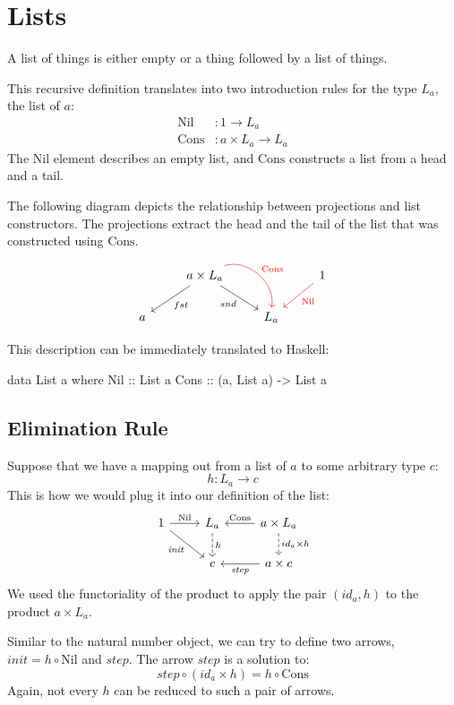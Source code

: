 \documentclass[DaoFP]{subfiles}
\begin{document}
\section{Lists}

A list of things is either empty or a thing followed by a list of things. 

This recursive definition translates into two introduction rules for the type $L_a$, the list of $a$: 
\begin{align*}
 \text{Nil} &\colon 1 \to L_a \\
 \text{Cons} &\colon a \times L_a \to L_a 
\end{align*}
The $\text{Nil}$ element describes an empty list, and $\text{Cons}$ constructs a list from a head and a tail. 

The following diagram depicts the relationship between projections and list constructors. The projections extract the head and the tail of the list that was constructed using $\text{Cons}$.
\[
 \begin{tikzcd}
 & a \times L_a
 \arrow[ld, "fst"]
 \arrow[rd,  "snd"']
 \arrow[rd, bend left=60, red, "\text{Cons}"]
 && 1
 \arrow[ld, red, "\text{Nil}"]
 \\
 a
&&L_a
  \end{tikzcd}
\]

This description can be immediately translated to Haskell:
\begin{haskell}
data List a where
  Nil  :: List a
  Cons :: (a, List a) -> List a
\end{haskell}



\subsection{Elimination Rule}

Suppose that we have a mapping out from a list of $a$ to some arbitrary type $c$:
\[h \colon L_a \to c\]
This is how we would plug it into our definition of the list:
\[
 \begin{tikzcd}
 1
 \arrow[r, "\text{Nil}"]
 \arrow[rd, "\mathit{init}"']
 &L_a
\arrow[d, dashed, "h"]
&a \times L_a
  \arrow[l, "\text{Cons}"']
\arrow[d, dashed, "id_a \times h"]
\\
& c
& a \times c
\arrow[l, "\mathit{step}"]
  \end{tikzcd}
\]
We used the functoriality of the product to apply the pair $(id_a, h)$ to the product $a \times L_a$.

Similar to the natural number object, we can try to define two arrows, $\mathit{init} = h \circ \text{Nil}$ and $\mathit{step}$. The arrow $\mathit{step}$ is a solution to:
\[ \mathit{step} \circ (id_a \times h) = h \circ \text{Cons} \]
Again, not every $h$ can be reduced to such a pair of arrows.
\end{document}
